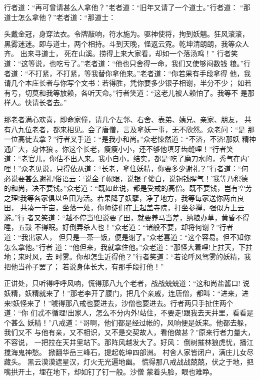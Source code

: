 行者道：“再可曾请甚么人拿他？”老者道：“旧年又请了一个道士。”行者道：
“那道士怎么拿他？”老者道：“那道士：

头戴金冠，身穿法衣。令牌敲响，符水施为。驱神使将，拘到妖魑。狂风滚滚，
黑雾迷迷。即与道士，两个相持。斗到天晚，怪返云霓。乾坤清朗朗，我等众人齐。
出来寻道士，死在山溪。捞得上来大家看，却如一个落汤鸡！”
行者笑道：“这等说，也吃亏了。”老者道：“他也只舍得一命，我们又使够闷数钱
粮。”行者道：“不打紧，不打紧，等我替你拿他来。”老者道：“你若果有手段拿得
他，我请几个本庄长者与你写个文书：若得胜，凭你要多少银子相谢，半分不少；
如若有亏，切莫和我等放赖，各听天命。”行者笑道：“这老儿被人赖怕了。我等不
是那样人。快请长者去。”

那老者满心欢喜，即命家僮，请几个左邻、右舍、表弟、姨兄、亲家、朋友，
共有八九位老者，都来相见。会了唐僧，言及拿妖一事，无不欣然。众老问：“是
那一位高徒去拿？”行者叉手道：“是我小和尚。”众老悚然道：“不济，不济!那妖
精神通广大，身体狼。你这个长老，瘦瘦小小，还不够他填牙齿缝哩！”行者笑
道：“老官儿，你估不出人来。我小自小，结实，都是‘吃了磨刀水的，秀气在内’
哩！”众老见说，只得依从道：“长老，拿住妖精，你要多少谢礼？”行者道：“何
必说要甚么谢礼!俗语云：‘说金子幌眼，说银子傻白，说铜钱腥气！’我等乃积德
的和尚，决不要钱。”众老道：“既如此说，都是受戒的高僧。既不要钱，岂有空劳
之理!我等各家俱以鱼田为活。若果降了妖孽，净了地方，我等每家送你两亩良田，
共凑一千亩，坐落一处，你师徒们在上起盖寺院，打坐参禅，强似方上云游。”行
者又笑道：“越不停当!但说要了田，就要养马当差，纳粮办草，黄昏不得睡，五鼓
不得眠。好倒弄杀人也！”众老道：“诸般不要，却将何谢？”行者道：“我出家人，
但只是一茶一饭，便是谢了。”众老喜道：“这个容易。但不知你怎么拿他。”行者
道：“他但来，我就拿住他。”众老道：“那怪大着哩!上拄天，下拄地；来时风，去
时雾。你却怎生近得他？”行者笑道：“若论呼风驾雾的妖精，我把他当孙子罢了；
若说身体长大，有那手段打他！”

正讲处，只听得呼呼风响，慌得那八九个老者，战战兢兢道：“这和尚盐酱口!
说妖精，妖精就来了！”那老李开了腰门，把几个亲戚，连唐僧，都叫：“进来，进
来!妖怪来了！”唬得那八戒也要进去，沙僧也要进去。行者两只手扯住两个道：“你
们忒不循理!出家人，怎么不分内外!站住，不要走!跟我去天井里，看看是个甚么
妖精！”八戒道：“哥啊，他们都是经过帐的，风响便是妖来。他都去躲，我们又不
与他有亲，又不相识，又不是交契故人，看他做甚？”原来行者力量大，不容说，
一把拉在天井里站下。那阵风越发大了。好风：
倒树摧林狼虎忧，播江搅海鬼神愁。
掀翻华岳三峰石，提起乾坤四部洲。
村舍人家皆闭户，满庄儿女尽藏头。
黑云漠漠遮星汉，灯火无光遍地幽。
慌得那八戒战战兢兢，伏之于地，把嘴拱开土，埋在地下，却如钉了钉一般。沙僧
蒙着头脸，眼也难睁。

